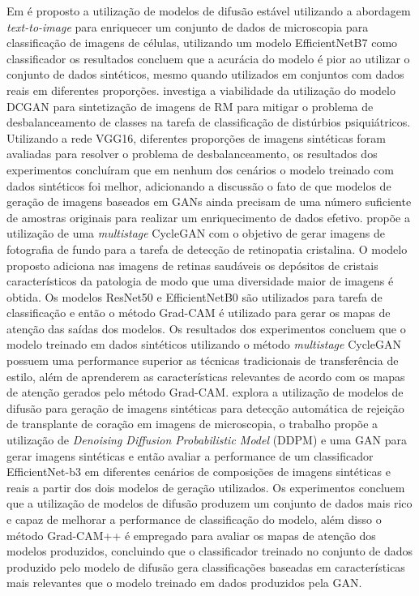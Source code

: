 Em  é proposto a utilização de modelos de difusão estável utilizando a abordagem \textit{text-to-image} para enriquecer um conjunto de dados de microscopia para classificação de imagens de células, utilizando um modelo EfficientNetB7 como classificador os resultados concluem que a acurácia do modelo é pior ao utilizar o conjunto de dados sintéticos, mesmo quando utilizados em conjuntos com dados reais em diferentes proporções.
 investiga a viabilidade da utilização do modelo DCGAN para sintetização de imagens de RM para mitigar o problema de desbalanceamento de classes na tarefa de classificação de distúrbios psiquiátricos. Utilizando a rede VGG16, diferentes proporções de imagens sintéticas foram avaliadas para resolver o problema de desbalanceamento, os resultados dos experimentos concluíram que em nenhum dos cenários o modelo treinado com dados sintéticos foi melhor, adicionando a discussão o fato de que modelos de geração de imagens baseados em GANs ainda precisam de uma número suficiente de amostras originais para realizar um enriquecimento de dados efetivo.
 propõe a utilização de uma \textit{multistage} CycleGAN  com o objetivo de gerar imagens de fotografia de fundo para a tarefa de detecção de retinopatia cristalina. O modelo proposto adiciona nas imagens de retinas saudáveis os depósitos de cristais característicos da patologia de modo que uma diversidade maior de imagens é obtida. Os modelos ResNet50 e EfficientNetB0 são utilizados para tarefa de classificação e então o método Grad-CAM é utilizado para gerar os mapas de atenção das saídas dos modelos. Os resultados dos experimentos concluem que o modelo treinado em dados sintéticos utilizando o método \textit{multistage} CycleGAN possuem uma performance superior as técnicas tradicionais de transferência de estilo, além de aprenderem as características relevantes de acordo com os mapas de atenção gerados pelo método Grad-CAM.
 explora a utilização de modelos de difusão para geração de imagens sintéticas para detecção automática de rejeição de transplante de coração em imagens de microscopia, o trabalho propõe a utilização de \textit{Denoising Diffusion Probabilistic Model} (DDPM) e uma GAN para gerar imagens sintéticas e então avaliar a performance de um classificador EfficientNet-b3 em diferentes cenários de composições de imagens sintéticas e reais a partir dos dois modelos de geração utilizados. Os experimentos concluem que a utilização de modelos de difusão produzem um conjunto de dados mais rico e capaz de melhorar a performance de classificação do modelo, além disso o método Grad-CAM++ é empregado para avaliar os mapas de atenção dos modelos produzidos, concluindo que o classificador treinado no conjunto de dados produzido pelo modelo de difusão gera classificações baseadas em características mais relevantes que o modelo treinado em dados produzidos pela GAN.

